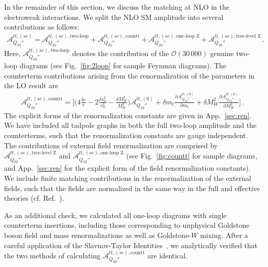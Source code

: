 \documentclass[letter,11pt,DIV=12,abstract=true,numbers=noenddot,titlepage=false,twocolumn=false,draft=false]{scrartcl}
\begin{document}
In the remainder of this section, we discuss the matching at NLO in
the electroweak interactions. We split the NLO SM amplitude into
several contributions as follows:
\begin{equation}
\begin{split}
{\mathcal A}_{Q_{S2}''}^{tt,(se)}
=
{\mathcal A}_{Q_{S2}''}^{tt,(se),\text{two-loop}}
+
{\mathcal A}_{Q_{S2}''}^{tt,(se),\text{countt}}
+
{\mathcal A}_{Q_{S2}''}^{tt,(se),\text{one-loop Z}}
+
{\mathcal A}_{Q_{S2}''}^{tt,(se),\text{tree-level Z}} \,.
\end{split}
\end{equation}
Here, ${\mathcal A}_{Q_{S2}''}^{tt,(se),\text{two-loop}}$ denotes the
contribution of the ${\mathcal O}(30\,000)$ genuine two-loop diagrams
(see Fig.~\ref{fig:2loop} for sample Feynman diagrams). The
counterterm contributions arising from the renormalization of the
parameters in the LO result are
\begin{equation}
\begin{split}
{\mathcal A}_{Q_{S2}''}^{tt,(se),\text{countt}}
 =  
    \bigg[ \bigg(   4 \frac{\delta e}{e}
                  - 2 \frac{\delta s_w^2}{s_w^2}
                  - \frac{\delta M_W^2}{M_W^2} \bigg) {\mathcal A}_{Q_{S2}''}^{tt,(0)}
    + \delta m_t \frac{\partial {\mathcal A}_{Q_{S2}''}^{tt,(0)}}{\partial m_t}
    + \delta M_W^2 \frac{\partial {\mathcal A}_{Q_{S2}''}^{tt,(0)}}{\partial M_W^2}
    \bigg] \,.
\end{split}
\end{equation}
The explicit forms of the renormalization constants are given in
App.~\ref{sec:ren}. We have included all tadpole graphs in both the
full two-loop amplitude and the counterterms, such that the
renormalization constants are gauge independent. The contributions of
external field renormalization are comprised by ${\mathcal
  A}_{Q_{S2}''}^{tt,(se),\text{tree-level Z}}$ and ${\mathcal
  A}_{Q_{S2}''}^{tt,(se),\text{one-loop Z}}$ (see
Fig.~\ref{fig:countt} for sample diagrams, and App.~\ref{sec:ren} for
the explicit form of the field renormalization constants). We include
finite matching contributions in the renormalization of the external
fields, such that the fields are normalized in the same way in the
full and effective theories (cf. Ref.~\cite{Buras:2002vd}).

As an additional check, we calculated all one-loop diagrams with
single counterterm insertions, including those corresponding to
unphysical Goldstone boson field and mass renormalizations as well as
Goldstone-$W$ mixing. After a careful application of the
Slavnov-Taylor Identities~\cite{Gambino:1998rt}, we analytically
verified that the two methods of calculating ${\mathcal
  A}_{Q_{S2}''}^{tt,(se),\text{countt}}$ are identical.
\end{document}
